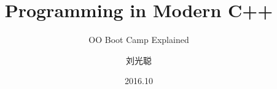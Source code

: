 \title[OO Boot Camp Explained]
{Programming in Modern C++}

\subtitle{OO Boot Camp Explained}

\author[刘光聪]
{ 刘光聪
}


\date[2016.10]{2016.10}